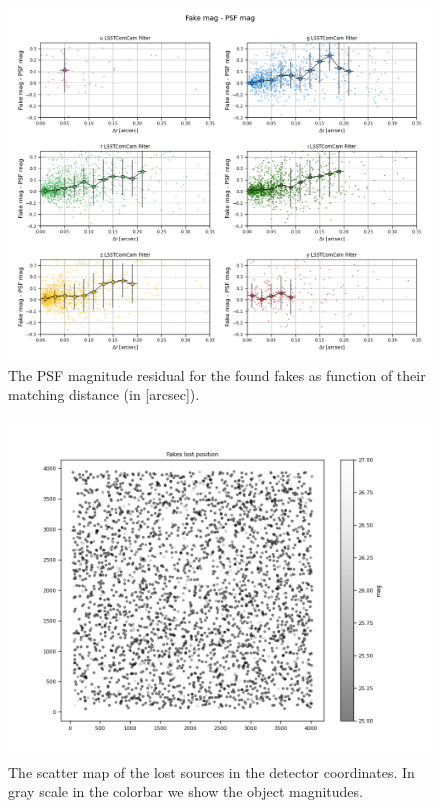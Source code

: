 \begin{figure}
    \centering
    \includegraphics[width=0.95\linewidth]{figures/scatter_dist_psf_mag_perfilter.png}
    \caption{The PSF magnitude residual for the found fakes as function of their matching distance (in [arcsec]).}
    \label{fig:photometric_recovery_vs_astrometric_dist}
\end{figure}

\begin{figure}
    \centering
    \includegraphics[width=0.95\linewidth]{figures/lost_sources_detector_map.png}
    \caption{The scatter map of the lost sources in the detector coordinates. In gray scale in the colorbar we show the object magnitudes.}
    \label{fig:lost_sources_xy}
\end{figure}


